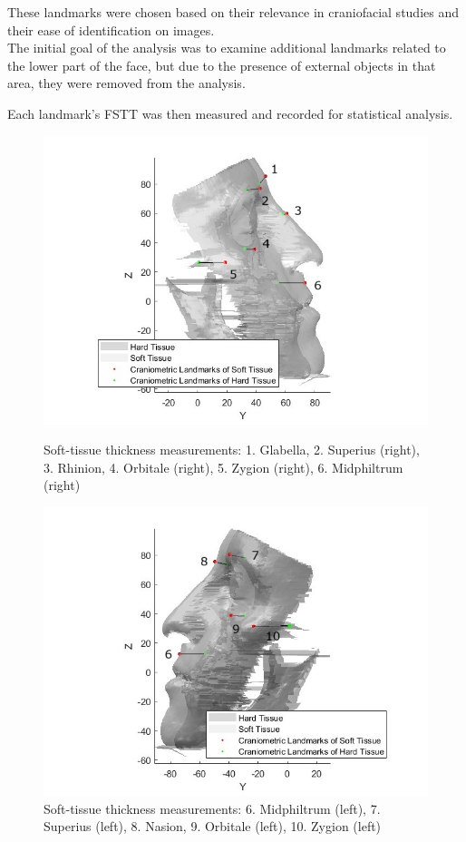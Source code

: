 \documentclass[journal,article,submit,pdftex,moreauthors]{Definitions/mdpi}
\begin{document}
These landmarks were chosen based on their relevance in craniofacial studies and their ease of identification on images.
\\The initial goal of the analysis was to examine additional landmarks related to the lower part of the face, but due to the presence of external objects in that area, they were removed from the analysis.

Each landmark’s FSTT was then measured and recorded for statistical analysis.

\begin{figure}[H]
\centering
\begin{minipage}{0.45\textwidth}
\centering
\includegraphics[width=1\linewidth]{Definitions/right_num.jpg}
\caption{Soft-tissue thickness
measurements: 1. Glabella, 2. Superius (right), 3. Rhinion, 4. Orbitale (right),  5. Zygion (right), 6. Midphiltrum (right)}
\label{fig1}
\end{minipage}\hfill
\begin{minipage}{0.45\textwidth}
\centering
\includegraphics[width=1\linewidth]{Definitions/left_num.jpg}
\caption{Soft-tissue thickness
measurements: 6. Midphiltrum (left), 7. Superius (left), 8. Nasion, 9. Orbitale (left),  10. Zygion (left)}
\label{fig2}
\end{minipage}
\end{figure}
\end{document}
